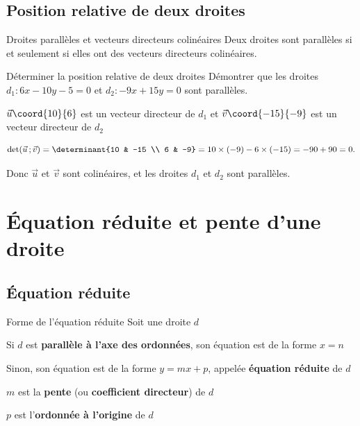 \subsection{Position relative de deux droites}

\begin{prop}{Droites parallèles et vecteurs directeurs colinéaires}
	Deux droites sont parallèles si et seulement si elles ont des vecteurs
	directeurs colinéaires.
\end{prop}

\begin{methode}{Déterminer la position relative de deux droites}
	Démontrer que les droites $d_1 : 6x - 10y - 5 = 0$ et
	$d_2 : -9x + 15y = 0$ sont parallèles.

	\begin{correction}

		$\vec{u}\coord{10}{6}$ est un vecteur directeur de $d_1$ et
		$\vec{v}\coord{-15}{-9}$ est un vecteur directeur de $d_2$

		\[
			\det(\vec{u}\,;\vec{v}) = \determinant{10 & -15 \\ 6 & -9}
			= 10 \times (-9) - 6 \times (-15) = -90 + 90 = 0.
		\]

		Donc $\vec{u}$ et $\vec{v}$ sont colinéaires, et les droites $d_1$ et
		$d_2$ sont parallèles.
	\end{correction}
\end{methode}

\section{Équation réduite et pente d'une droite}

\subsection{Équation réduite}

\begin{prop}{Forme de l'équation réduite}
	Soit une droite $d$
	\bi
	\item Si $d$ est \textbf{parallèle à l'axe des ordonnées}, son équation
	est de la forme $x = n$
	\item Sinon, son équation est de la forme $y = mx + p$, appelée
	\textbf{équation réduite} de $d$
	\bi
	\item $m$ est la \textbf{pente} (ou \textbf{coefficient directeur}) de $d$
	\item $p$ est l'\textbf{ordonnée à l'origine} de $d$
	\ei
	\ei
\end{prop}

